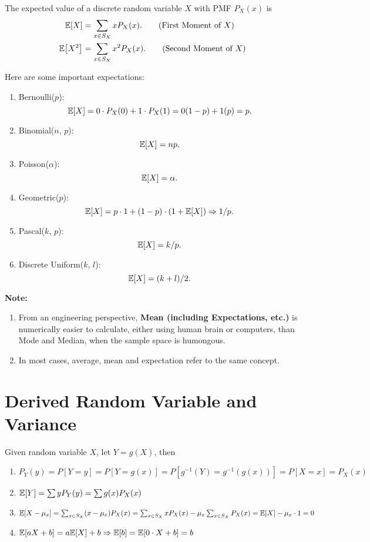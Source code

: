\begin{definition}
    The expected value of a discrete random variable $X$ with \textnormal{PMF} $P_X(x)$ is
    \begin{align}
        \E{X}&=\sum_{x\in S_X}xP_X(x). \tag{First Moment of $X$}\\
        \E{X^2}&=\sum_{x\in S_X}x^2P_X(x). \tag{Second Moment of $X$}
    \end{align}
\end{definition}

\begin{theorem}
    Here are some important expectations:
    \begin{enumerate}
        \item Bernoulli($p$): \[\E{X}=0\cdot P_X(0)+1\cdot P_X(1)=0(1-p)+1(p)=p.\]
        \item Binomial($n$, $p$): \[\E{X}=np.\]
        \item Poisson($\alpha$): \[\E{X}=\alpha.\]
        \item Geometric($p$): \[\E{X}=p\cdot 1 + (1-p)\cdot (1+\E{X})\Rightarrow 1/p.\]
        \item Pascal($k$, $p$): \[\E{X}=k/p.\]
        \item Discrete Uniform($k$, $l$): \[\E{X}=(k+l)/2.\]
    \end{enumerate}
\end{theorem}

\textbf{Note:}{
    \begin{enumerate}
        \item From an engineering perspective, \textbf{Mean (including Expectations, etc.)} is numerically easier to calculate, either using human brain or computers, than Mode and Median, when the sample space is humongous.
        \item In most cases, average, mean and expectation refer to the same concept.
    \end{enumerate}
}

\section{Derived Random Variable and Variance}
\begin{theorem}
    Given random variable $X$, let $Y = g(X)$, then
    \begin{enumerate}
        \item $P_Y(y) = P[Y=y] = P[Y=g(x)] = P[g^{-1}(Y)=g^{-1}(g(x))] = P[X=x] = P_X(x)$
        \item $\E{Y} = \sum yP_Y(y) = \sum g(x)P_X(x)$
        \item $\E{X-\mu_x}=\sum_{x\in S_X}(x-\mu_x)P_X(x)=\sum_{x\in S_X}xP_X(x)-\mu_x\sum_{x\in S_X}P_X(x)=\E{X}-\mu_x\cdot 1=0$
        \item $\E{aX+b}=a\E{X}+b \Rightarrow \E{b}=\E{0\cdot X+b}=b$
    \end{enumerate}
\end{theorem}

